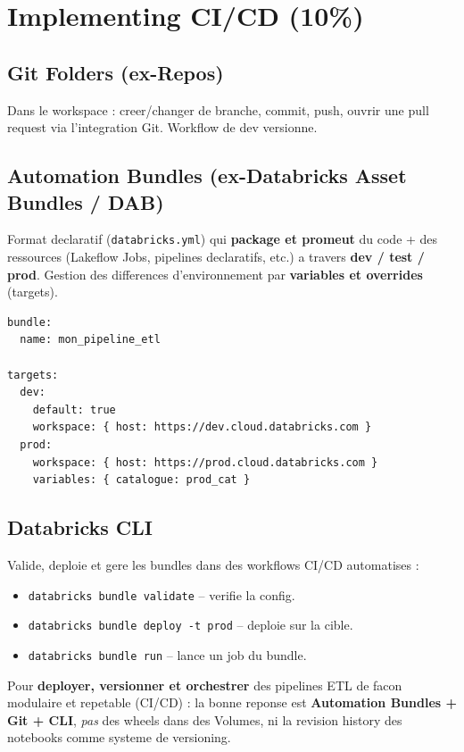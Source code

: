 \documentclass[11pt,a4paper]{article}
\begin{document}
\section{Implementing CI/CD (10\%)}

\subsection{Git Folders (ex-Repos)}

Dans le workspace : creer/changer de branche, commit, push, ouvrir une pull request via
l'integration Git. Workflow de dev versionne.

\subsection{Automation Bundles (ex-Databricks Asset Bundles / DAB)}

Format declaratif (\texttt{databricks.yml}) qui \textbf{package et promeut} du code + des
ressources (Lakeflow Jobs, pipelines declaratifs, etc.) a travers \textbf{dev / test / prod}.
Gestion des differences d'environnement par \textbf{variables et overrides} (targets).

\begin{lstlisting}[style=sqlstyle,caption={Structure d'un bundle (databricks.yml, simplifie)}]
bundle:
  name: mon_pipeline_etl

targets:
  dev:
    default: true
    workspace: { host: https://dev.cloud.databricks.com }
  prod:
    workspace: { host: https://prod.cloud.databricks.com }
    variables: { catalogue: prod_cat }
\end{lstlisting}

\subsection{Databricks CLI}

Valide, deploie et gere les bundles dans des workflows CI/CD automatises :
\begin{itemize}[leftmargin=*,nosep]
  \item \texttt{databricks bundle validate} -- verifie la config.
  \item \texttt{databricks bundle deploy -t prod} -- deploie sur la cible.
  \item \texttt{databricks bundle run} -- lance un job du bundle.
\end{itemize}

\begin{piege}
Pour \textbf{deployer, versionner et orchestrer} des pipelines ETL de facon modulaire et
repetable (CI/CD) : la bonne reponse est \textbf{Automation Bundles + Git + CLI}, \emph{pas}
des wheels dans des Volumes, ni la revision history des notebooks comme systeme de versioning.
\end{piege}
\end{document}
